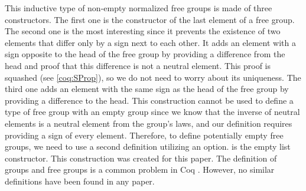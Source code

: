 This inductive type  of non-empty normalized free groups is made of three constructors. The first one  is the constructor of the last element of a free group. The second one  is the most interesting since it prevents the existence of two elements that differ only by a sign next to each other. It adds an element with a sign opposite to the head of the free group by providing a difference from the head and proof that this difference is not a neutral element. This proof is squashed (see \ref{coq:SProp}), so we do not need to worry about its uniqueness. The third one adds an element with the same sign as the head of the free group by providing a difference to the head. This construction cannot be used to define a type of free group with an empty group since we know that the inverse of neutral elements is a neutral element from the group's laws, and our definition requires providing a sign of every element. Therefore, to define potentially empty free groups, we need to use a second definition utilizing an option.  is the empty list constructor. This construction was created for this paper. The definition of groups and free groups is a common problem in Coq \cite{GroupsCoq} \cite{FreeGroupsCoq}. However, no similar definitions have been found in any paper. 

